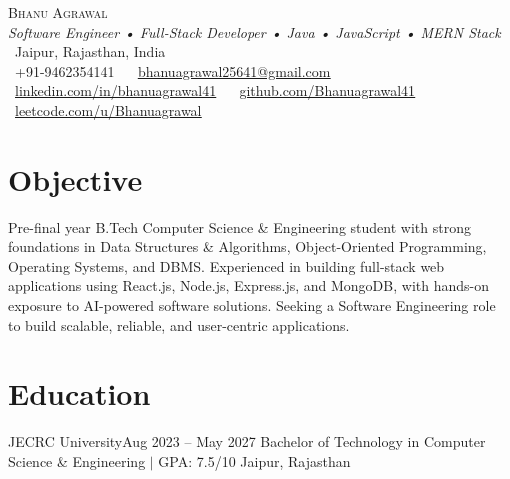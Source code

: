 





\begin{center}
{\Huge \scshape Bhanu Agrawal} \\ \vspace{1pt}
{\small\textit{Software Engineer • Full-Stack Developer • Java • JavaScript • MERN Stack}}\\ \vspace{1pt}
\small \faMapMarker*~Jaipur, Rajasthan, India \\ \vspace{1pt}
\small
\faPhone~+91-9462354141 ~
\faEnvelope~\href{mailto:bhanuagrawal25641@gmail.com}{\underline{bhanuagrawal25641@gmail.com}} ~
\faLinkedin~\href{https://www.linkedin.com/in/bhanuagrawal41}{\underline{linkedin.com/in/bhanuagrawal41}} ~
\faGithub~\href{https://github.com/Bhanuagrawal41}{\underline{github.com/Bhanuagrawal41}} ~
\faCode~\href{https://leetcode.com/u/Bhanuagrawal/}{\underline{leetcode.com/u/Bhanuagrawal}}
\end{center}

\section{Objective}
\vspace{2pt}
\begin{itemize}[leftmargin=0.15in,label={}]
\small{\item{
Pre-final year B.Tech Computer Science \& Engineering student with strong foundations in Data Structures \& Algorithms, Object-Oriented Programming, Operating Systems, and DBMS. Experienced in building full-stack web applications using React.js, Node.js, Express.js, and MongoDB, with hands-on exposure to AI-powered software solutions. Seeking a Software Engineering role to build scalable, reliable, and user-centric applications.
}}
\end{itemize}

\section{Education}

\resumeSubHeadingListStart

\resumeSubheading
{JECRC University}{Aug 2023 -- May 2027}
{Bachelor of Technology in Computer Science \& Engineering $|$ GPA: 7.5/10}
{Jaipur, Rajasthan}

